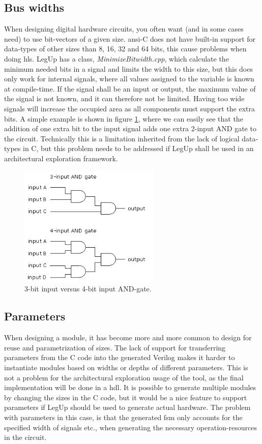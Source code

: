 \subsection{Bus widths}
When designing digital hardware circuits, you often want (and in some cases need) to use bit-vectors of a given size. \gls{ansi}-C does not have built-in support for data-types of other sizes than 8, 16, 32 and 64 bits, this cause problems when doing \gls{hls}. LegUp has a class, \textit{MinimizeBitwidth.cpp}, which calculate the minimum needed bits in a signal and limits the width to this size, but this does only work for internal signals, where all values assigned to the variable is known at compile-time. If the signal shall be an input or output, the maximum value of the signal is not known, and it can therefore not be limited. Having too wide signals will increase the occupied area as all components must support the extra bits. A simple example is shown in figure \ref{fig:andgate34}, where we can easily see that the addition of one extra bit to the input signal adds one extra 2-input AND gate to the circuit. Technically this is a limitation inherited from the lack of logical data-types in C, but this problem needs to be addressed if LegUp shall be used in an architectural exploration framework.
\begin{figure}[hbpt]
\centering
\includegraphics[width=0.6\textwidth]{../figs/AndGate34Bit.png}
\caption{\label{fig:andgate34}3-bit input versus 4-bit input AND-gate.}
\end{figure}

\subsection{\label{subsec:parameterprobs}Parameters}
When designing a module, it has become more and more common to design for reuse and parametrization of sizes. The lack of support for transferring parameters from the C code into the generated Verilog makes it harder to instantiate modules based on widths or depths of different parameters. This is not a problem for the architectural exploration usage of the tool, as the final implementation will be done in a \gls{hdl}. It is possible to generate multiple modules by changing the sizes in the C code, but it would be a nice feature to support parameters if LegUp should be used to generate actual hardware. The problem with parameters in this case, is that the generated \gls{fsm} only accounts for the specified width of signals etc., when generating the necessary operation-resources in the circuit.

